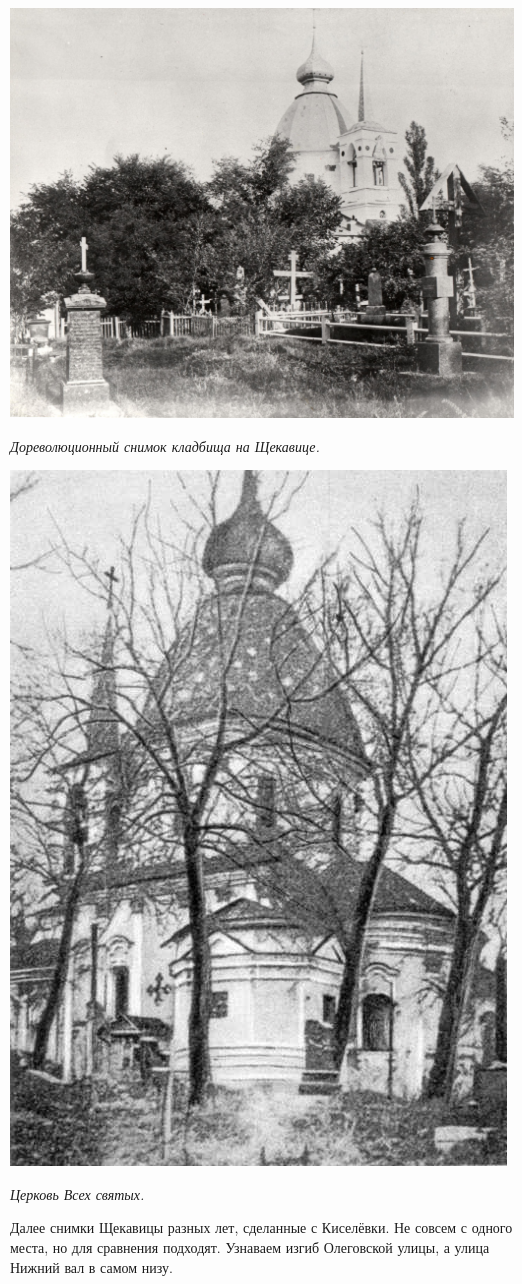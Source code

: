 \begin{center}
\includegraphics[width=\linewidth]{chast-colebanie-osnov/sheka/sheka_kladb2.jpg}

\textit{Дореволюционный снимок кладбища на Щекавице.}
\end{center}

\begin{center}
\includegraphics[width=0.50\linewidth]{chast-colebanie-osnov/sheka/vseh.jpg}

\textit{Церковь Всех святых.}
\end{center}

\newpage

Далее снимки Щекавицы разных лет, сделанные с Киселёвки. Не совсем с одного места, но для сравнения подходят. Узнаваем изгиб Олеговской улицы, а улица Нижний вал в самом низу.

